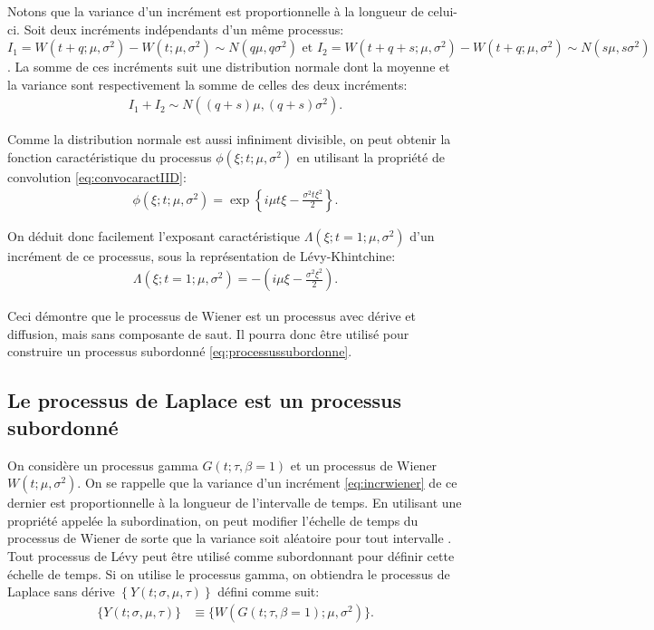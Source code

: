 Notons que la variance d'un incrément est proportionnelle à la
longueur de celui-ci.  Soit deux incréments indépendants d'un même
processus: $I_1 = W(t+q;\mu,\sigma^2) - W(t;\mu,\sigma^2) \sim
N(q\mu,q\sigma^2) \mbox{ et } I_2 = W(t+q+s;\mu,\sigma^2) -
W(t+q;\mu,\sigma^2) \sim N(s\mu,s\sigma^2)$. La somme de ces
incréments suit une distribution normale dont la moyenne et la
variance sont respectivement la somme de celles des deux incréments:
\begin{align}
  I_1+I_2 \sim N((q+s)\mu, (q+s)\sigma^2).
\end{align}

Comme la distribution normale est aussi infiniment divisible, on peut
obtenir la fonction caractéristique du processus
$\phi(\xi;t;\mu,\sigma^2)$ en utilisant la propriété de convolution
\eqref{eq:convocaractIID}:
\begin{align}
  \phi(\xi;t;\mu,\sigma^2) = \exp\left\{ i\mu t
    \xi-\frac{\sigma^2t\xi^2}{2} \right\}.
\end{align}

On déduit donc facilement l'exposant caractéristique
$\Lambda(\xi;t=1;\mu,\sigma^2)$ d'un incrément de ce processus, sous
la représentation de Lévy-Khintchine:
\begin{align}
  \label{eq:exposantcaractnormale}
  \Lambda(\xi;t=1;\mu,\sigma^2) = -(i\mu \xi-\frac{\sigma^2\xi^2}{2}).
\end{align}

Ceci démontre que le processus de Wiener est un processus avec dérive
et diffusion, mais sans composante de saut. Il pourra donc être
utilisé pour construire un processus subordonné
\eqref{eq:processussubordonne}.

\subsection{Le processus de Laplace est un processus subordonné}
\label{sec:browniensub}

On considère un processus gamma $G(t;\tau,\beta=1)$ et un processus de
Wiener $W(t;\mu,\sigma^2)$. On se rappelle que la variance d'un
incrément \eqref{eq:incrwiener} de ce dernier est proportionnelle à la
longueur de l'intervalle de temps. En utilisant une propriété appelée
la subordination, on peut modifier l'échelle de temps du processus de
Wiener de sorte que la variance soit aléatoire pour tout intervalle
. Tout processus de Lévy peut être utilisé comme subordonnant pour
définir cette échelle de temps. Si on utilise le processus gamma, on
obtiendra le processus de Laplace sans dérive
$\left\{Y(t;\sigma,\mu,\tau)\right\}$ défini comme suit:
\begin{align}
  \label{eq:VGsubordinne}
  \lbrace Y(t;\sigma,\mu,\tau)\rbrace &\equiv \lbrace
  W(G(t;\tau,\beta=1);\mu,\sigma^2)\rbrace.
\end{align}

